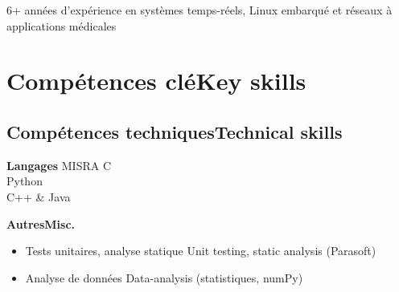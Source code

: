 \vspace{-1.cm}

\ifnativelang
\newcommand{\CVheader}{6+ ann\'ees d'exp\'erience en syst\`emes temps-r\'eels, Linux embarqu\'e et r\'eseaux \`a applications m\'edicales}
\else
\newcommand{\CVheader}{6+ years of experience in Real-Time systems, embedded linux and networking for medical applications}
\fi

\begin{center}
\textcolor{color1}{\Large{\CVheader}}
\end{center}

\section{\ifnativelang Comp\'etences cl\'e\else Key skills\fi}
\subsection{\ifnativelang Comp\'etences techniques\else Technical skills\fi}

{\textbf{Langages}}{
 MISRA C\\
 Python \\
 C++ \& Java
}

\vspace{\ItemsSpacing}

{\textbf{\ifnativelang Autres\else Misc.\fi}}{
\begin{itemize}
\item \ifnativelang Tests unitaires, analyse statique \else Unit testing, static analysis \fi (Parasoft)
\item \ifnativelang Analyse de donn\'ees \else Data-analysis \fi (statistiques, numPy)
\end{itemize}
}



